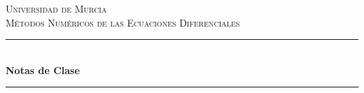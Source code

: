 \begin{titlepage}

\newcommand{\HRule}{\rule{\linewidth}{0.5mm}} %

\center %
 

\textsc{\LARGE Universidad de Murcia}\\[1.5cm] %
\textsc{\Large Métodos Numéricos de las Ecuaciones Diferenciales}\\[0.5cm] %


\HRule \\[0.4cm]
{ \huge \bfseries Notas de Clase}\\[0.4cm] %
\HRule \\[1.5cm]
 



\end{titlepage}
